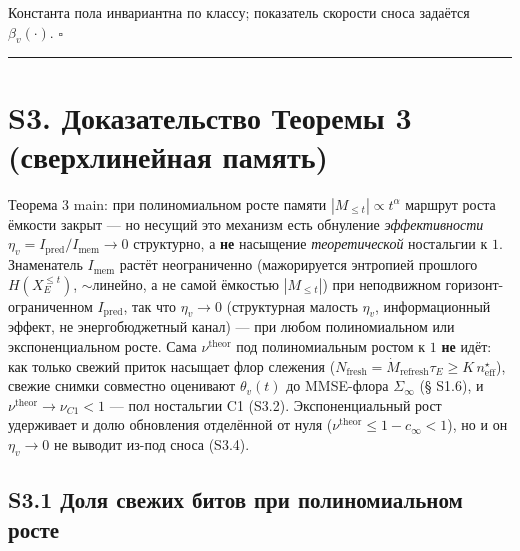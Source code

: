 \documentclass[12pt]{iopart}
\begin{document}
Константа пола инвариантна по классу; показатель скорости сноса задаётся \(\beta_v(\cdot)\). \(\square\)



\begin{center}\rule{0.5\linewidth}{0.5pt}\end{center}



\section{S3. Доказательство Теоремы 3 (сверхлинейная память)}\label{s3.-ux434ux43eux43aux430ux437ux430ux442ux435ux43bux44cux441ux442ux432ux43e-ux442ux435ux43eux440ux435ux43cux44b-3-ux441ux432ux435ux440ux445ux43bux438ux43dux435ux439ux43dux430ux44f-ux43fux430ux43cux44fux442ux44c}



Теорема 3 main: при полиномиальном росте памяти \(|M_{\le t}| \propto t^\alpha\) маршрут роста ёмкости закрыт --- но несущий это механизм есть обнуление \emph{эффективности} \(\eta_v = I_{\text{pred}}/I_{\text{mem}} \to 0\) структурно, а \textbf{не} насыщение \emph{теоретической} ностальгии к \(1\). Знаменатель \(I_{\text{mem}}\) растёт неограниченно (мажорируется энтропией прошлого \(H(X_E^{\le t})\), \(\sim\)линейно, а не самой ёмкостью \(|M_{\le t}|\)) при неподвижном горизонт-ограниченном \(I_{\text{pred}}\), так что \(\eta_v \to 0\) (структурная малость \(\eta_v\), информационный эффект, не энергобюджетный канал) --- при любом полиномиальном или экспоненциальном росте. Сама \(\nu^{\text{theor}}\) под полиномиальным ростом к \(1\) \textbf{не} идёт: как только свежий приток насыщает флор слежения (\(N_{\text{fresh}} = \dot M_{\text{refresh}}\tau_E \ge K\,n_{\text{eff}}^\star\)), свежие снимки совместно оценивают \(\theta_v(t)\) до MMSE-флора \(\Sigma_\infty\) (§ S1.6), и \(\nu^{\text{theor}} \to \nu_{C1} < 1\) --- пол ностальгии C1 (S3.2). Экспоненциальный рост удерживает и долю обновления отделённой от нуля (\(\nu^{\text{theor}} \le 1-c_\infty < 1\)), но и он \(\eta_v \to 0\) не выводит из-под сноса (S3.4).



\subsection{S3.1 Доля свежих битов при полиномиальном росте}\label{s3.1-ux434ux43eux43bux44f-ux441ux432ux435ux436ux438ux445-ux431ux438ux442ux43eux432-ux43fux440ux438-ux43fux43eux43bux438ux43dux43eux43cux438ux430ux43bux44cux43dux43eux43c-ux440ux43eux441ux442ux435}
\end{document}
